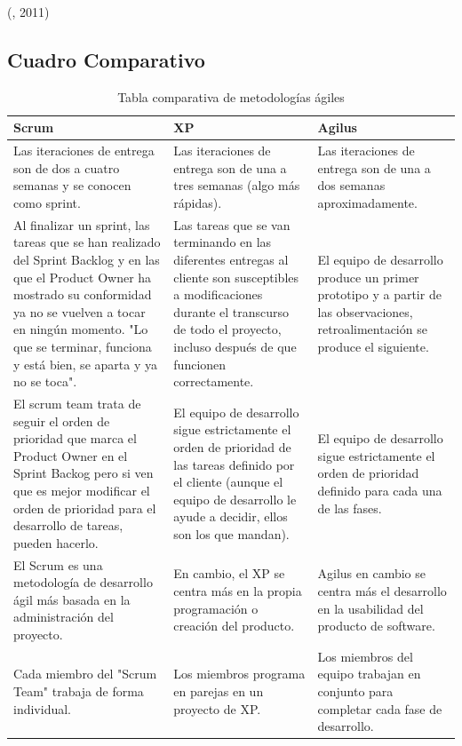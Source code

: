 (\citet{agilusbib}, 2011) 
\newpage
\subsection{Cuadro Comparativo}


\begin{table}[H]	
\begin{center}
\begin{tabular}{ | m{4cm} | m{4cm}| m{4cm}| } 
 \hline
 Scrum & XP & Agilus \\
 \hline
 Las iteraciones de entrega son de dos a cuatro semanas y se conocen como sprint. 
 &
 Las iteraciones de entrega son de una a tres semanas (algo más rápidas). 
 & 
 Las iteraciones de entrega son de una a dos semanas aproximadamente.\\
 \hline
 Al finalizar un sprint, las tareas que se han realizado del Sprint Backlog y en las que el Product Owner ha mostrado su conformidad ya no se vuelven a tocar en ningún momento. "Lo que se terminar, funciona y está bien, se aparta y ya no se toca".
 & 
 Las tareas que se van terminando en las diferentes entregas al cliente son susceptibles a modificaciones durante el transcurso de todo el proyecto, incluso después de que funcionen correctamente.
 & 
 El equipo de desarrollo produce un primer prototipo y a partir de las observaciones, retroalimentación se produce el siguiente.\\
 \hline
 El scrum team trata de seguir el orden de prioridad que marca el Product Owner en el Sprint Backog pero si ven que es mejor modificar el orden de prioridad para el desarrollo de tareas, pueden hacerlo.
 & 
 El equipo de desarrollo sigue estrictamente el orden de prioridad de las tareas definido por el cliente (aunque el equipo de desarrollo le ayude a decidir, ellos son los que mandan).
 & 
 El equipo de desarrollo sigue estrictamente el orden de prioridad definido para cada una de las fases.\\
 \hline
 El Scrum es una metodología de desarrollo ágil más basada en la administración del proyecto.
 & 
 En cambio, el XP se centra más en la propia programación o creación del producto.
 & 
 Agilus en cambio se centra más el desarrollo en la usabilidad del producto de software.\\
 \hline
 Cada miembro del "Scrum Team" trabaja de forma individual.
 & 
 Los miembros programa en parejas en un proyecto de XP.
 & 
 Los miembros del equipo trabajan en conjunto para completar cada fase de desarrollo.\\
 \hline
\end{tabular}
\caption{Tabla comparativa de metodologías ágiles}
\label{Tabla:2}
\end{center}
\end{table}	







